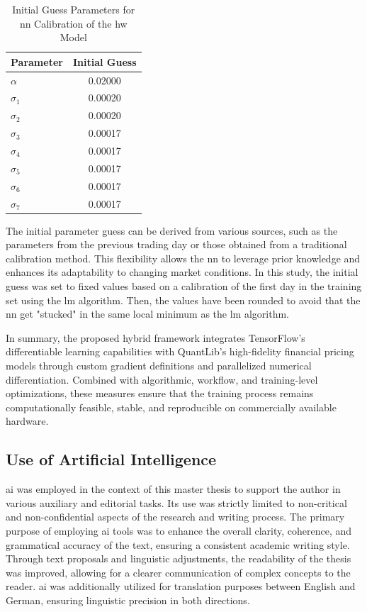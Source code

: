 \begin{table}[H]
	\centering
	\begin{threeparttable}
		\caption{Initial Guess Parameters for \ac{nn} Calibration of the \ac{hw} Model}
		\label{tab:hw_initial_guess}
		\begin{tabular}{l c}
			\hline
			Parameter  & Initial Guess \\
			\hline
			$\alpha$   & 0.02000       \\
			$\sigma_1$ & 0.00020       \\
			$\sigma_2$ & 0.00020       \\
			$\sigma_3$ & 0.00017       \\
			$\sigma_4$ & 0.00017       \\
			$\sigma_5$ & 0.00017       \\
			$\sigma_6$ & 0.00017       \\
			$\sigma_7$ & 0.00017       \\
			\hline
		\end{tabular}
	\end{threeparttable}
\end{table}

The initial parameter guess can be derived from various sources, such as the parameters from the previous trading day or those obtained from a traditional calibration method. This flexibility allows the \ac{nn} to leverage prior knowledge and enhances its adaptability to changing market conditions. In this study, the initial guess was set to fixed values based on a calibration of the first day in the training set using the \ac{lm} algorithm. Then, the values have been rounded to avoid that the \ac{nn} get "stucked" in the same local minimum as the \ac{lm} algorithm.

In summary, the proposed hybrid framework integrates TensorFlow's differentiable learning capabilities with QuantLib's high-fidelity financial pricing models through custom gradient definitions and parallelized numerical differentiation. Combined with algorithmic, workflow, and training-level optimizations, these measures ensure that the training process remains computationally feasible, stable, and reproducible on commercially available hardware.

\subsection{Use of Artificial Intelligence}
\ac{ai} was employed in the context of this master thesis to support the author in various auxiliary and editorial tasks. Its use was strictly limited to non-critical and non-confidential aspects of the research and writing process. The primary purpose of employing \ac{ai} tools was to enhance the overall clarity, coherence, and grammatical accuracy of the text, ensuring a consistent academic writing style. Through text proposals and linguistic adjustments, the readability of the thesis was improved, allowing for a clearer communication of complex concepts to the reader. \ac{ai} was additionally utilized for translation purposes between English and German, ensuring linguistic precision in both directions.

